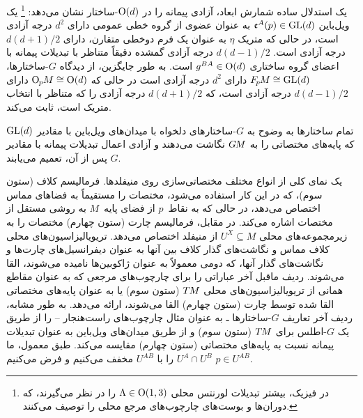 یک استدلال ساده شمارش ابعاد، آزادی پیمانه را در $\operatorname{O}(d)$-ساختار نشان می‌دهد:%
\footnote{
	در فیزیک، بیشتر تبدیلات لورنتس محلی $\Lambda \in \operatorname{O}(1,3)$ را در نظر می‌گیرند، که دوران‌ها و بوست‌های چارچوب‌های مرجع محلی را توصیف می‌کنند.
}
یک ویل‌باین $\mathfrak{e}^A(p) \in \operatorname{GL}(d)$ به عنوان عضوی از گروه خطی عمومی دارای $d^2$ درجه آزادی است، در حالی که متریک $\eta$ به عنوان یک فرم دوخطی متقارن، دارای $d(d+1)/2$ درجه آزادی است.
$d(d-1)/2$ درجه آزادی گمشده دقیقاً متناظر با تبدیلات پیمانه با اعضای گروه ساختاری $g^{BA} \in \operatorname{O}(d)$ است.
به طور جایگزین، از دیدگاه $G$-ساختارها، $F_{\mkern-1.5mu p}\mkern-1.0muM \cong \operatorname{GL}(d)$ دارای $d^2$ درجه آزادی است در حالی که $\operatorname{O}_{\mkern-1.1mu p}\mkern-3.4muM \cong \operatorname{O}(d)$ دارای $d(d-1)/2$ درجه آزادی است، که $d(d+1)/2$ درجه آزادی را که متناظر با انتخاب متریک است، ثابت می‌کند.


تمام ساختارها به وضوح به $G$-ساختارهای دلخواه با میدان‌های ویل‌باین با مقادیر $\operatorname{GL}(d)$ که پایه‌های مختصاتی را به $G\mkern-1.4muM$ نگاشت می‌دهند و آزادی اعمال تبدیلات پیمانه با مقادیر $G$ پس از آن، تعمیم می‌یابند.



\begin{landscape}
	\begin{table}[h!]
		\vspace*{8ex}
		\centering%
		\scalebox{1.}{%
			
		}%
		\vspace*{4ex}%
		\captionsetup{width=.9\linewidth}
		\caption{
			یک نمای کلی از انواع مختلف مختصاتی‌سازی روی منیفلدها.
			فرمالیسم کلاف (ستون سوم)، که در این کار استفاده می‌شود، مختصات را مستقیماً به فضاهای مماس اختصاص می‌دهد، در حالی که به نقاط~$p$ از فضای پایه~$M$ به روشی مستقل از مختصات اشاره می‌کند.
			در مقابل، فرمالیسم چارت (ستون چهارم) مختصات را به زیرمجموعه‌های محلی $U^X \subseteq M$ از منیفلد اختصاص می‌دهد.
			تریویالیزاسیون‌های محلی کلاف مماس و نگاشت‌های گذار کلاف بین آنها به عنوان دیفرانسیل‌های چارت‌ها و نگاشت‌های گذار آنها، که دومی معمولاً به عنوان ژاکوبین‌ها نامیده می‌شوند، القا می‌شوند.
			ردیف ماقبل آخر عباراتی را برای چارچوب‌های مرجعی که به عنوان مقاطع همانی از تریویالیزاسیون‌های محلی $T\mkern-1.5muM$ (ستون سوم) یا به عنوان پایه‌های مختصاتی القا شده توسط چارت (ستون چهارم) القا می‌شوند، ارائه می‌دهد.
			به طور مشابه، ردیف آخر تعاریف $G$-ساختارها ـ به عنوان مثال چارچوب‌های راست‌هنجار -- را از طریق یک $G$-اطلس برای $T\mkern-1.5muM$ (ستون سوم) و از طریق میدان‌های ویل‌باین به عنوان تبدیلات پیمانه نسبت به پایه‌های مختصاتی (ستون چهارم) مقایسه می‌کند.
			طبق معمول، ما $U^A \cap U^B$ را با $U^{AB}$ مخفف می‌کنیم و فرض می‌کنیم $p\in U^{AB}$.
		}
		\label{tab:coord_charts_gauge_trafos}
	\end{table}
\end{landscape}